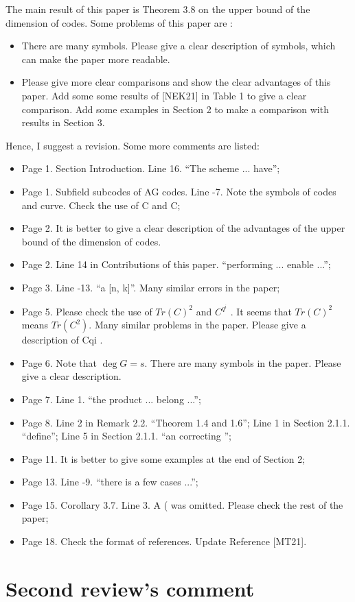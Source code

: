 \documentclass[12pt,a4paper]{amsart}
\begin{document}
The main result of this paper is Theorem 3.8 on the upper bound of the dimension of codes. Some problems
of this paper are :
\begin{itemize}
\item  There are many symbols. Please give a clear description of symbols, which can make the paper more
readable.
\item  Please give more clear comparisons and show the clear advantages of this paper. Add some some
results of [NEK21] in Table 1 to give a clear comparison. Add some examples in Section 2 to make
a comparison with results in Section 3.
\end{itemize}
Hence, I suggest a revision. Some more comments are listed:
\begin{itemize}
\item  Page 1. Section Introduction. Line 16. “The scheme ... have”;
\item  Page 1. Subfield subcodes of AG codes. Line -7. Note the symbols of codes and curve. Check the
use of C and C;
\item  Page 2. It is better to give a clear description of the advantages of the upper bound of the dimension
of codes.
\item  Page 2. Line 14 in Contributions of this paper. “performing ... enable ...”;
\item  Page 3. Line -13. “a [n, k]”. Many similar errors in the paper;
\item  Page 5. Please check the use of $Tr(C)^2$ and $ C^{q^i}$
. It seems that $Tr(C)^2$ means $Tr(C^2)$.
Many similar problems in the paper. Please give a description of Cqi
.
\item  Page 6. Note that $\deg G = s$. There are many symbols in the paper. Please give a clear description.
\item  Page 7. Line 1. “the product ... belong ...”;
\item  Page 8. Line 2 in Remark 2.2. “Theorem 1.4 and 1.6”; Line 1 in Section 2.1.1. “define”; Line 5 in
Section 2.1.1. “an correcting ”;
\item  Page 11. It is better to give some examples at the end of Section 2;
\item  Page 13. Line -9. “there is a few cases ...”;
\item  Page 15. Corollary 3.7. Line 3. A ( was omitted. Please check the rest of the paper;
\item  Page 18. Check the format of references. Update Reference [MT21].
\end{itemize} 
\section*{Second review's comment}
\end{document}
